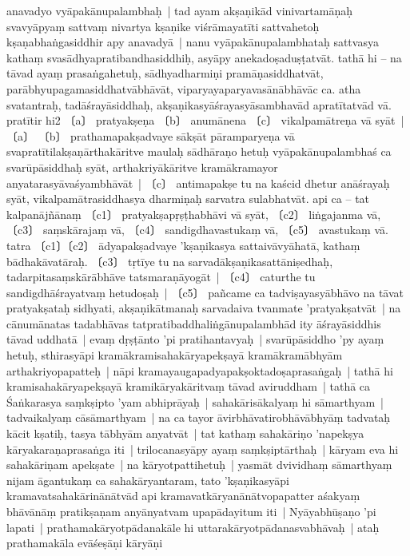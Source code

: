 \documentclass[article,a4paper]{memoir}
\newcommand{\persName}[1]{#1}
\begin{document}
anavadyo vyā\-pakā\-nupalambhaḥ | tad ayam akṣaṇikā\-d vinivartamā\-ṇaḥ svavyā\-pyaṃ sattvaṃ nivartya kṣaṇike viśrā\-mayatī\-ti sattvahetoḥ kṣaṇabhaṅgasiddhir apy anavadyā\- | \label{thakur75-85.1} nanu vyā\-pakā\-nupalambhataḥ sattvasya kathaṃ svasā\-dhyapratibandhasiddhiḥ, asyā\-py anekadoṣaduṣṭatvā\-t. tathā\- hi – na tā\-vad ayaṃ prasaṅgahetuḥ, sā\-dhyadharmiṇi pramā\-ṇasiddhatvā\-t, parā\-bhyupagamasiddhatvā\-bhā\-vā\-t, viparyayaparyavasā\-nā\-bhā\-vā\-c ca. atha svatantraḥ, tadā\-śrayā\-siddhaḥ, akṣaṇikasyā\-śrayasyā\-sambhavā\-d apratī\-tatvā\-d vā\-. pratī\-tir hi2 〔a〕 pratyakṣeṇa 〔b〕 anumā\-nena 〔c〕 vikalpamā\-treṇa vā\- syā\-t | \label{thakur75-85.6} 〔a〕 〔b〕 prathamapakṣadvaye sā\-kṣā\-t pā\-ramparyeṇa vā\- svapratī\-tilakṣaṇā\-rthakā\-ritve maulaḥ sā\-dhā\-raṇo hetuḥ vyā\-pakā\-nupalambhaś ca svarū\-pā\-siddhaḥ syā\-t, arthakriyā\-kā\-ritve kramā\-kramayor anyatarasyā\-vaśyambhā\-vā\-t | \label{thakur75-85.8} 〔c〕 antimapakṣe tu na kaścid dhetur anā\-śrayaḥ syā\-t, vikalpamā\-trasiddhasya dharmiṇaḥ sarvatra sulabhatvā\-t. \label{thakur75-85.10} api ca – tat kalpanā\-jñā\-naṃ 〔c1〕 pratyakṣapṛṣṭhabhā\-vi vā\- syā\-t, 〔c2〕 liṅgajanma vā\-, 〔c3〕 saṃskā\-rajaṃ vā\-, 〔c4〕 sandigdhavastukaṃ vā\-, 〔c5〕 avastukaṃ vā\-. \label{thakur75-85.12} tatra 〔c1〕〔c2〕 ā\-dyapakṣadvaye 'kṣaṇikasya sattaivā\-vyā\-hatā\-, kathaṃ bā\-dhakā\-vatā\-raḥ. \label{thakur75-85.12a} 〔c3〕 tṛtī\-ye tu na sarvadā\-kṣaṇikasattā\-niṣedhaḥ, tadarpitasaṃskā\-rā\-bhā\-ve tatsmaraṇā\-yogā\-t | \label{thakur75-85.13} 〔c4〕 caturthe tu sandigdhā\-śrayatvaṃ hetudoṣaḥ | \label{thakur75-85.14} 〔c5〕 pañcame ca tadviṣayasyā\-bhā\-vo na tā\-vat pratyakṣataḥ sidhyati, akṣaṇikā\-tmanaḥ sarvadaiva tvanmate 'pratyakṣatvā\-t | na cā\-numā\-natas tadabhā\-vas tatpratibaddhaliṅgā\-nupalambhā\-d ity ā\-śrayā\-siddhis tā\-vad uddhatā\- | evaṃ dṛṣṭā\-nto 'pi pratihantavyaḥ | \label{thakur75-85.18} svarū\-pā\-siddho 'py ayaṃ hetuḥ, sthirasyā\-pi kramā\-kramisahakā\-ryapekṣayā\- kramā\-kramā\-bhyā\-m arthakriyopapatteḥ | nā\-pi kramayaugapadyapakṣoktadoṣaprasaṅgaḥ | tathā\- hi kramisahakā\-ryapekṣayā\- kramikā\-ryakā\-ritvaṃ tā\-vad aviruddham | \label{thakur75-85.21} tathā\- ca Śaṅkarasya saṃkṣipto 'yam abhiprā\-yaḥ | sahakā\-risā\-kalyaṃ hi sā\-marthyam | tadvaikalyaṃ cā\-sā\-marthyam | na ca tayor ā\-virbhā\-vatirobhā\-vā\-bhyā\-ṃ tadvataḥ kā\-cit kṣatiḥ, tasya tā\-bhyā\-m anyatvā\-t | tat kathaṃ sahakā\-riṇo 'napekṣya kā\-ryakaraṇaprasaṅga iti | \label{thakur75-85.25} \persName{trilocanasyā\-}py ayaṃ saṃkṣiptā\-rthaḥ | kā\-ryam eva hi sahakā\-riṇam apekṣate | na kā\-ryotpattihetuḥ | yasmā\-t dvividhaṃ sā\-marthyaṃ nijam ā\-gantukaṃ ca sahakā\-ryantaram, tato 'kṣaṇikasyā\-pi kramavatsahakā\-rinā\-nā\-tvā\-d api kramavatkā\-ryanā\-nā\-tvopapatter aśakyaṃ bhā\-vā\-nā\-ṃ pratikṣaṇam anyā\-nyatvam upapā\-dayitum iti | \label{thakur75-85.29} Nyā\-yabhū\-ṣaṇo 'pi lapati | prathamakā\-ryotpā\-danakā\-le hi uttarakā\-ryotpā\-danasvabhā\-vaḥ | ataḥ prathamakā\-la evā\-śeṣā\-ṇi kā\-ryā\-ṇi 
\end{document}
